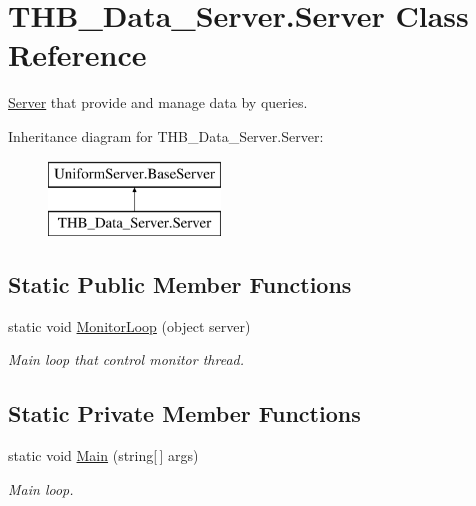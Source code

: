 \hypertarget{class_t_h_b___data___server_1_1_server}{}\section{T\+H\+B\+\_\+\+Data\+\_\+\+Server.\+Server Class Reference}
\label{class_t_h_b___data___server_1_1_server}


\mbox{\hyperlink{class_t_h_b___data___server_1_1_server}{Server}} that provide and manage data by queries.  


Inheritance diagram for T\+H\+B\+\_\+\+Data\+\_\+\+Server.\+Server\+:\begin{figure}[H]
\begin{center}
\leavevmode
\includegraphics[height=2.000000cm]{dc/d42/class_t_h_b___data___server_1_1_server}
\end{center}
\end{figure}
\subsection*{Static Public Member Functions}
\begin{DoxyCompactItemize}
\item 
static void \mbox{\hyperlink{class_t_h_b___data___server_1_1_server_a7410e66cc0584f3d59d6b2c5892e9b12}{Monitor\+Loop}} (object server)
\begin{DoxyCompactList}\small\item\em Main loop that control monitor thread. \end{DoxyCompactList}\end{DoxyCompactItemize}
\subsection*{Static Private Member Functions}
\begin{DoxyCompactItemize}
\item 
static void \mbox{\hyperlink{class_t_h_b___data___server_1_1_server_a87515fb7b3422af002d33dd3fbe8f4e9}{Main}} (string\mbox{[}$\,$\mbox{]} args)
\begin{DoxyCompactList}\small\item\em Main loop. \end{DoxyCompactList}\end{DoxyCompactItemize}
